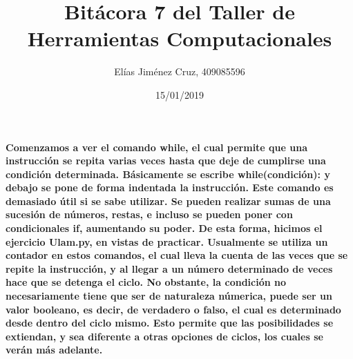 \documentclass[letterpaper, 12pt, oneside]{article} %
\title{\Huge Bitácora 7 del Taller de Herramientas Computacionales}
\author{Elías Jiménez Cruz, 409085596}
\date{15/01/2019}
\begin{document}
	\maketitle
	\paragraph{Comenzamos a ver el comando while, el cual permite que una instrucción se repita varias veces hasta que deje de cumplirse una condición determinada. Básicamente se escribe while(condición): y debajo se pone de forma indentada la instrucción. Este comando es demasiado útil si se sabe utilizar. Se pueden realizar sumas de una sucesión de números, restas, e incluso se pueden poner con condicionales if, aumentando su poder. De esta forma, hicimos el ejercicio Ulam.py, en vistas de practicar. Usualmente se utiliza un contador en estos comandos, el cual lleva la cuenta de las veces que se repite la instrucción, y al llegar a un número determinado de veces hace que se detenga el ciclo. No obstante, la condición no necesariamente tiene que ser de naturaleza númerica, puede ser un valor booleano, es decir, de verdadero o falso, el cual es determinado desde dentro del ciclo mismo. Esto permite que las posibilidades se extiendan, y sea diferente a otras opciones de ciclos, los cuales se verán más adelante.}
\end{document}

